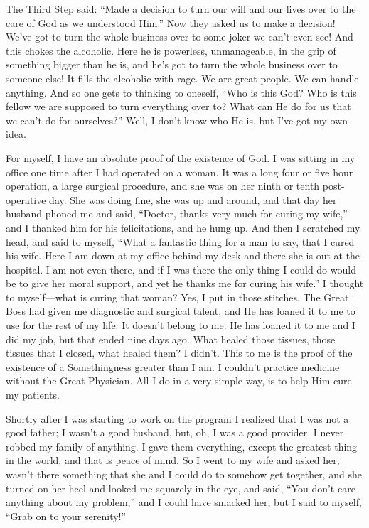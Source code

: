 \begin{biblechapter}
\verse The Third Step said: 
    “Made a decision to turn our will 
    and our lives over to the care of God 
    as we understood Him.”
\verse Now they asked us to make a decision!
\verse We’ve got to turn the whole business over 
    to some joker we can’t even see!
\verse And this chokes the alcoholic.
\verse Here he is powerless, unmanageable, 
    in the grip of something bigger than he is, 
    and he’s got to turn the whole business over to someone else!
\verse It fills the alcoholic with rage.
\verse We are great people.
\verse We can handle anything.
\verse And so one gets to thinking to oneself, 
    “Who is this God?
\verse Who is this fellow we are supposed to turn everything over to?
\verse What can He do for us that we can’t do for ourselves?”
\verse Well, I don’t know who He is, but I’ve got my own idea.

\verse For myself, 
    I have an absolute proof of the existence of God.
\verse I was sitting in my office 
    one time after I had operated on a woman.
\verse It was a long four or five hour operation, 
    a large surgical procedure, 
    and she was on her ninth or tenth post-operative day.
\verse She was doing fine, she was up and around, 
    and that day her husband phoned me and said, 
    “Doctor, thanks very much for curing my wife,” 
    and I thanked him for his felicitations, and he hung up.
\verse And then I scratched my head, and said to myself, 
    “What a fantastic thing for a man to say, 
    that I cured his wife.
\verse Here I am down at my office behind my desk 
    and there she is out at the hospital.
\verse I am not even there, 
    and if I was there the only thing I could do 
    would be to give her moral support, 
    and yet he thanks me for curing his wife.”
\verse I thought to myself—what is curing that woman?
\verse Yes, I put in those stitches.
\verse The Great Boss had given me diagnostic and surgical talent, 
    and He has loaned it to me to use for the rest of my life.
\verse It doesn’t belong to me.
\verse He has loaned it to me and I did my job, 
    but that ended nine days ago.
\verse What healed those tissues, 
    those tissues that I closed, 
    what healed them?
\verse I didn’t.
\verse This to me is the proof 
    of the existence of a Somethingness greater than I am.
\verse I couldn’t practice medicine without the Great Physician.
\verse All I do in a very simple way, 
    is to help Him cure my patients.

\verse Shortly after I was starting to work on the program 
    I realized that I was not a good father; 
    I wasn’t a good husband, 
    but, oh, I was a good provider.
\verse I never robbed my family of anything.
\verse I gave them everything, 
    except the greatest thing in the world, 
    and that is peace of mind.
\verse So I went to my wife and asked her, 
    wasn’t there something 
    that she and I could do to somehow get together, 
    and she turned on her heel and looked me squarely in the eye, 
    and said, 
    “You don’t care anything about my problem,” 
    and I could have smacked her, but I said to myself, 
    “Grab on to your serenity!”


\end{biblechapter}
